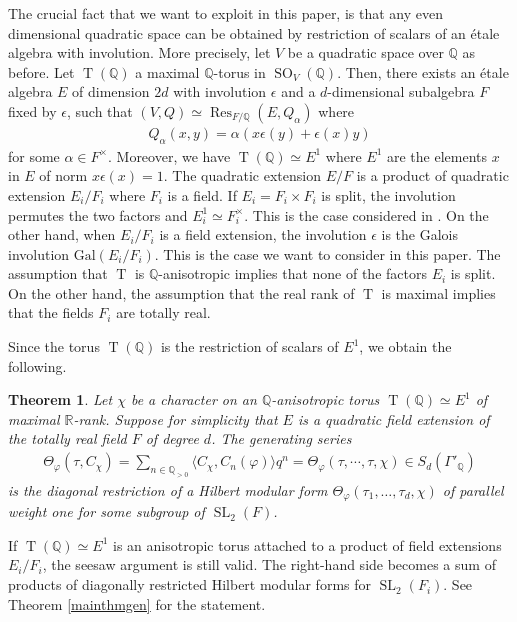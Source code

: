 \documentclass[11pt]{article} %
\newcommand{\8}{\infty}
\newcommand{\Tbf}{\operatorname{T}}
\newcommand{\SO}{\operatorname{SO}}
\newcommand{\SL}{\operatorname{SL}}
\newcommand{\R}{\mathbb{R}}
\newcommand{\Q}{\mathbb{Q}}
\newcommand{\Res}{\operatorname{Res}}
\newcommand{\Gal}{\textrm{Gal}}
\theoremstyle{mytheoremstyle}
\newtheorem{thm}{Theorem}[section]
\theoremstyle{remark}
\numberwithin{equation}{section}
\begin{document}
\subsubsection{} The crucial fact that we want to exploit in this paper, is that any even dimensional quadratic space can be obtained by restriction of scalars of an \'etale algebra with involution. More precisely, let $V$ be a quadratic space over $\Q$ as before. Let $\Tbf(\Q)$ a maximal $\Q$-torus in $\SO_V(\Q)$. Then, there exists an \'etale algebra $E$ of dimension $2d$ with involution $\epsilon$ and a $d$-dimensional subalgebra $F$ fixed by $\epsilon$, such that $(V,Q)\simeq \Res_{F/\Q}(E,Q_\alpha)$ where 
\begin{align}
    Q_\alpha(x,y)=\alpha (x \epsilon(y)+\epsilon(x)y)
\end{align}
for some $\alpha \in F^\times$. Moreover, we have $\Tbf(\Q)\simeq E^1$ where $E^1$ are the elements $x$ in $E$ of norm $x\epsilon(x)=1$.
The quadratic extension $E/F$ is a product of quadratic extension $E_i/F_i$ where $F_i$ is a field. If $E_i=F_i \times F_i$ is split, the involution permutes the two factors and $E_i^1 \simeq F_i^\times$. This is the case considered in \cite{rbrforum}. On the other hand, when $E_i/F_i$ is a field extension, the involution $\epsilon$ is the Galois involution $\Gal(E_i/F_i)$. This is the case we want to consider in this paper. The assumption that $\Tbf$ is $\Q$-anisotropic implies that none of the factors $E_i$ is split. On the other hand, the assumption that the real rank of $\Tbf$ is maximal implies that the fields $F_i$ are totally real.

Since the torus $\Tbf(\Q)$ is the restriction of scalars of $E^1$, we obtain the following.

\begin{thm}\label{diagrestthm}
    Let $\chi$ be a character on an $\Q$-anisotropic torus $\Tbf(\Q) \simeq E^1$ of maximal $\R$-rank. Suppose for simplicity that $E$ is a quadratic field extension of the totally real field $F$ of degree $d$. The generating series
    \begin{align} \label{equationmainthm}
     \Theta_\varphi(\tau,C_\chi)=\sum_{n \in \Q_{>0}} \langle C_{\chi} , C_n(\varphi) \rangle q^n=\Theta_\varphi(\tau,\cdots,\tau,\chi) \in S_d(\Gamma'_\Q)
    \end{align}
    is the diagonal restriction of a Hilbert modular form $\Theta_{\varphi}(\tau_1,\dots,\tau_d,\chi)$ of parallel weight one for some subgroup of $\SL_2(F)$.
\end{thm}
If $\Tbf(\Q) \simeq E^1$ is an anisotropic torus attached to a product of field extensions $E_i/F_i$, the seesaw argument is still valid.  The right-hand side becomes a sum of products of diagonally restricted Hilbert modular forms for $\SL_2(F_i)$. See Theorem \ref{mainthmgen} for the statement.
\end{document}
